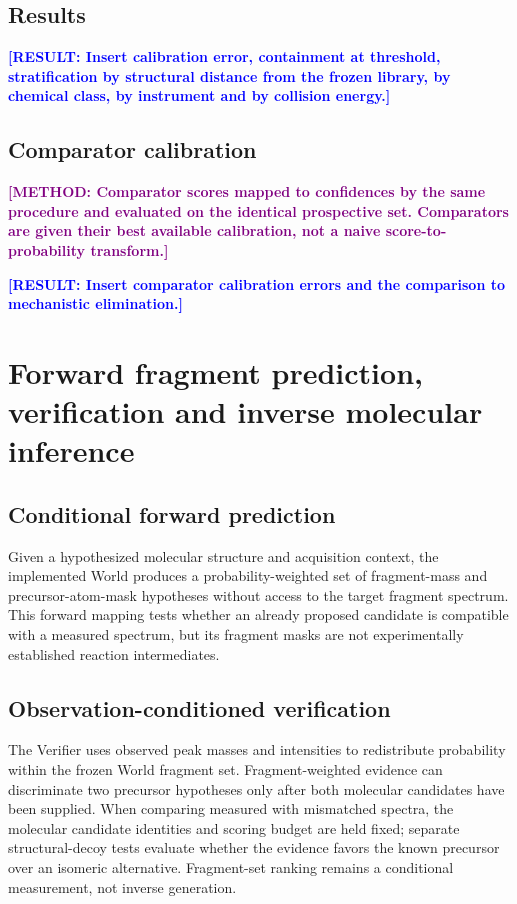 \documentclass[12pt]{article}
\newcommand{\result}[1]{\textbf{\textcolor{blue}{[RESULT: #1]}}}
\newcommand{\methodtodo}[1]{\textbf{\textcolor{purple}{[METHOD: #1]}}}
\begin{document}
\subsection{Results}
\result{Insert calibration error, containment at threshold, stratification by structural distance from the frozen library, by chemical class, by instrument and by collision energy.}

\subsection{Comparator calibration}
\methodtodo{Comparator scores mapped to confidences by the same procedure and evaluated on the identical prospective set. Comparators are given their best available calibration, not a naive score-to-probability transform.}

\result{Insert comparator calibration errors and the comparison to mechanistic elimination.}

\section{Forward fragment prediction, verification and inverse molecular inference}

\subsection{Conditional forward prediction}
Given a hypothesized molecular structure and acquisition context, the implemented World produces a probability-weighted set of fragment-mass and precursor-atom-mask hypotheses without access to the target fragment spectrum. This forward mapping tests whether an already proposed candidate is compatible with a measured spectrum, but its fragment masks are not experimentally established reaction intermediates.

\subsection{Observation-conditioned verification}
The Verifier uses observed peak masses and intensities to redistribute probability within the frozen World fragment set. Fragment-weighted evidence can discriminate two precursor hypotheses only after both molecular candidates have been supplied. When comparing measured with mismatched spectra, the molecular candidate identities and scoring budget are held fixed; separate structural-decoy tests evaluate whether the evidence favors the known precursor over an isomeric alternative. Fragment-set ranking remains a conditional measurement, not inverse generation.
\end{document}
